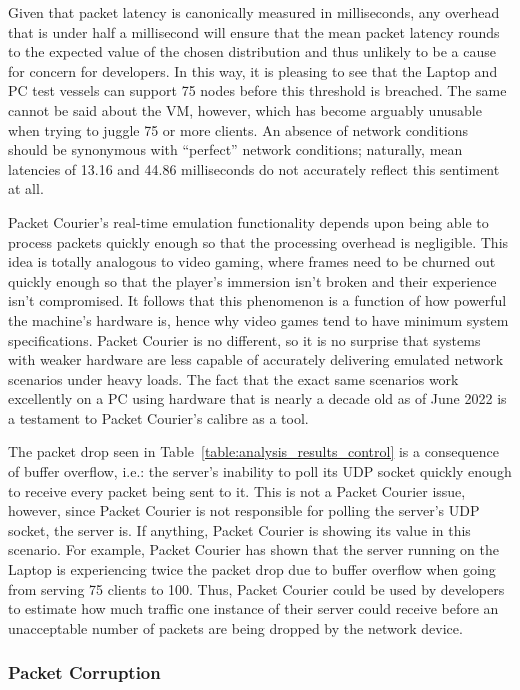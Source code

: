 Given that packet latency is canonically measured in milliseconds\cite{latency_vs_throughput}, any overhead that is
under half a millisecond will ensure that the mean packet latency rounds to the expected value of the chosen
distribution and thus unlikely to be a cause for concern for developers. In this way, it is pleasing to see that the
Laptop and PC test vessels can support 75 nodes before this threshold is breached. The same cannot be said about the
VM, however, which has become arguably unusable when trying to juggle 75 or more clients. An absence of network
conditions should be synonymous with ``perfect'' network conditions; naturally, mean latencies of 13.16 and 44.86
milliseconds do not accurately reflect this sentiment at all.

Packet Courier's real-time emulation functionality depends upon being able to process packets quickly enough so that
the processing overhead is negligible. This idea is totally analogous to video gaming, where frames need to be
churned out quickly enough so that the player's immersion isn't broken and their experience isn't compromised. It
follows that this phenomenon is a function of how powerful the machine's hardware is, hence why video games tend to
have minimum system specifications\cite{intel_gaming_system_requirements}. Packet Courier is no different, so it is
no surprise that systems with weaker hardware are less capable of accurately delivering emulated network scenarios
under heavy loads. The fact that the exact same scenarios work excellently on a PC using hardware that is nearly a
decade old as of June 2022\cite{intel_i7_4770k} is a testament to Packet Courier's calibre as a tool.

The packet drop seen in Table~\ref{table:analysis_results_control} is a consequence of buffer overflow, i.e.: the
server's inability to poll its UDP socket quickly enough to receive every packet being sent to it. This is not a
Packet Courier issue, however, since Packet Courier is not responsible for polling the server's UDP socket, the
server is. If anything, Packet Courier is showing its value in this scenario. For example, Packet Courier has shown
that the server running on the Laptop is experiencing twice the packet drop due to buffer overflow when going from
serving 75 clients to 100. Thus, Packet Courier could be used by developers to estimate how much traffic one instance
of their server could receive before an unacceptable number of packets are being dropped by the network device.

\subsubsection{Packet Corruption}\label{subsubsection:corruption_analysis}

